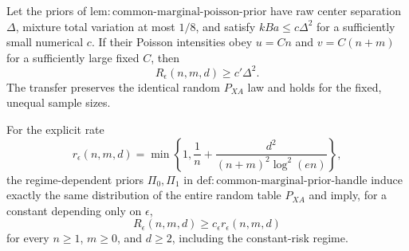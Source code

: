 Let the priors of \(\mathrm{lem:common\mbox{-}marginal\mbox{-}poisson\mbox{-}prior}\) have raw center separation \(\Delta\), mixture total variation at most \(1/8\), and satisfy \(kBa\le c\Delta^2\) for a sufficiently small numerical \(c\).  If their Poisson intensities obey \(u=Cn\) and \(v=C(n+m)\) for a sufficiently large fixed \(C\), then
\[
 R_\epsilon(n,m,d)\ge c'\Delta^2.
\]
The transfer preserves the identical random \(P_{XA}\) law and holds for the fixed, unequal sample sizes.

For the explicit rate
\[
 r_\epsilon(n,m,d)=\min\!\left\{1,\frac1n+\frac{d^2}{(n+m)^2\log^2(en)}\right\},
\]
the regime-dependent priors \(\Pi_0,\Pi_1\) in \(\mathrm{def:common\mbox{-}marginal\mbox{-}prior\mbox{-}handle}\) induce exactly the same distribution of the entire random table \(P_{XA}\) and imply, for a constant depending only on \(\epsilon\),
\[
 R_\epsilon(n,m,d)\ge c_\epsilon r_\epsilon(n,m,d)
\]
for every \(n\ge1\), \(m\ge0\), and \(d\ge2\), including the constant-risk regime.
